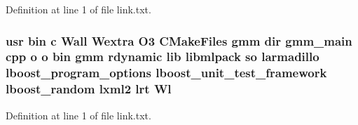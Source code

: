 Definition at line 1 of file link.\-txt.

\subsubsection[{Wl}]{\setlength{\rightskip}{0pt plus 5cm}usr bin c Wall Wextra O3 C\-Make\-Files gmm dir gmm\-\_\-main cpp o o bin gmm rdynamic lib libmlpack so larmadillo lboost\-\_\-program\-\_\-options lboost\-\_\-unit\-\_\-test\-\_\-framework lboost\-\_\-random lxml2 lrt Wl}\label{methods_2gmm_2CMakeFiles_2gmm_8dir_2link_8txt_af60a723f659ada425c1102fe8d7b4f9a}


Definition at line 1 of file link.\-txt.

